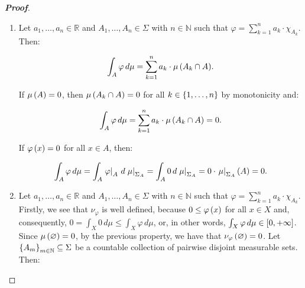 \begin{proposition}
\begin{proof}[\rm\textbf{Proof}]
\begin{enumerate}
      \begin{equation}
        \begin{split}
          \varphi=\sum_{k=1}^{n}{a_k\cdot\chi_{A_k}}=\sum_{k=1}^{n}{a_k\cdot\pr{\sum_{l=1}^{m}{\chi_{C_{k,l}}}}}=\sum_{k=1}^{n}{\sum_{l=1}^{m}{a_k\cdot\chi_{C_{k,l}}}},\\
          \psi=\sum_{l=1}^{m}{b_l\cdot\chi_{B_l}}=\sum_{l=1}^{m}{b_l\cdot\pr{\sum_{k=1}^{n}{\chi_{C_{k,l}}}}}=\sum_{k=1}^{n}{\sum_{l=1}^{m}{b_l\cdot\chi_{C_{k,l}}}}.
        \end{split}
      \end{equation}

      Given $k\in\set{1,\dots,n}$ and $l\in\set{1,\dots,m}$, if $x\in C_{k,l}$, then $\varphi\pr{x}=a_k\leq b_l=\psi\pr{x}$. Then:

      \begin{equation}
        \int_{X}{\varphi\,d\mu}=\sum_{k=1}^{n}{\sum_{l=1}^{m}{a_k\cdot\mu\pr{C_{k,l}}}}\leq\sum_{k=1}^{n}{\sum_{l=1}^{m}{b_l\cdot\mu\pr{C_{k,l}}}}=\int_{X}{\psi\,d\mu}.
      \end{equation}
      \item Let $a_1,\dots,a_n\in\mathbb{R}$ and $A_1,\dots,A_n\in\Sigma$ with $n\in\mathbb{N}$ such that $\varphi=\sum_{k=1}^{n}{a_k\cdot\chi_{A_k}}$. Then:
      
      \begin{equation}
        \int_{A}{\varphi\,d\mu}=\sum_{k=1}^{n}{a_k\cdot\mu\left(A_k\cap A\right)}.
      \end{equation}

      If $\mu\left(A\right)=0$, then $\mu\left(A_k\cap A\right)=0$ for all $k\in\set{1,\dots,n}$ by monotonicity and:
      
      \begin{equation}
        \int_{A}{\varphi\,d\mu}=\sum_{k=1}^{n}{a_k\cdot\mu\left(A_k\cap A\right)}=0.
      \end{equation}

      If $\varphi\left(x\right)=0$ for all $x\in A$, then:
      
      \begin{equation}
        \int_{A}{\varphi\,d\mu}=\int_{A}{\left.\varphi\right|_{A}\,d\left.\mu\right|_{\Sigma_A}}=\int_{A}{0\,d\left.\mu\right|_{\Sigma_A}}=0\cdot\left.\mu\right|_{\Sigma_A}\left(A\right)=0.
      \end{equation}
      
      \item Let $a_1,\dots,a_n\in\mathbb{R}$ and $A_1,\dots,A_n\in\Sigma$ with $n\in\mathbb{N}$ such that $\varphi=\sum_{k=1}^{n}{a_k\cdot\chi_{A_k}}$. Firstly, we see that $\nu_{\varphi}$ is well defined, because $0\leq\varphi\left(x\right)$ for all $x\in X$ and, consequently, $0=\int_{X}{0\,d\mu}\leq\int_{X}{\varphi\,d\mu}$, or, in other words, $\int_{X}{\varphi\,d\mu}\in\left[0,+\infty\right]$. Since $\mu\left(\varnothing\right)=0$, by the previous property, we have that $\nu_{\varphi}\left(\varnothing\right)=0$. Let $\left\{A_m\right\}_{m\in\mathbb{N}}\subseteq\Sigma$ be a countable collection of pairwise disjoint measurable sets. Then:
      


\end{enumerate}
\end{proof}
\end{proposition}
